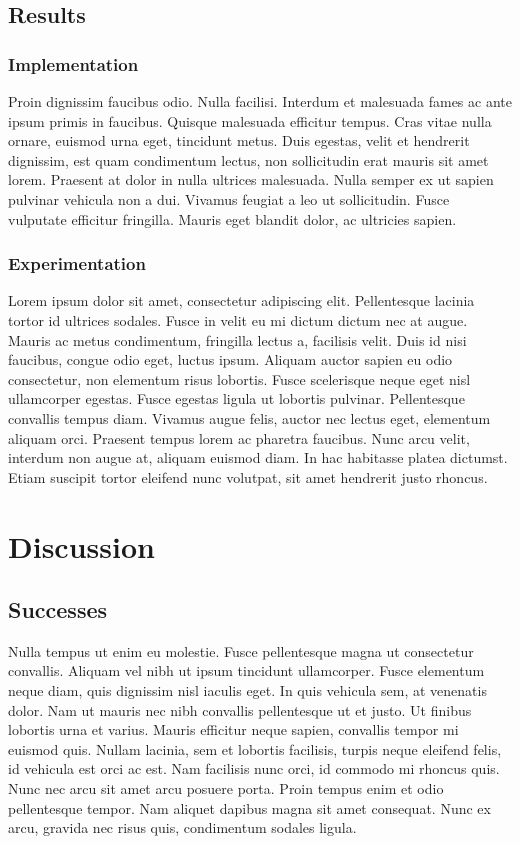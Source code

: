 \section{Results}

\subsection{Implementation}
Proin dignissim faucibus odio. Nulla facilisi. Interdum et malesuada fames ac ante ipsum primis in faucibus. Quisque malesuada efficitur tempus. Cras vitae nulla ornare, euismod urna eget, tincidunt metus. Duis egestas, velit et hendrerit dignissim, est quam condimentum lectus, non sollicitudin erat mauris sit amet lorem. Praesent at dolor in nulla ultrices malesuada. Nulla semper ex ut sapien pulvinar vehicula non a dui. Vivamus feugiat a leo ut sollicitudin. Fusce vulputate efficitur fringilla. Mauris eget blandit dolor, ac ultricies sapien.

\subsection{Experimentation}
Lorem ipsum dolor sit amet, consectetur adipiscing elit. Pellentesque lacinia tortor id ultrices sodales. Fusce in velit eu mi dictum dictum nec at augue. Mauris ac metus condimentum, fringilla lectus a, facilisis velit. Duis id nisi faucibus, congue odio eget, luctus ipsum. Aliquam auctor sapien eu odio consectetur, non elementum risus lobortis. Fusce scelerisque neque eget nisl ullamcorper egestas. Fusce egestas ligula ut lobortis pulvinar. Pellentesque convallis tempus diam. Vivamus augue felis, auctor nec lectus eget, elementum aliquam orci. Praesent tempus lorem ac pharetra faucibus. Nunc arcu velit, interdum non augue at, aliquam euismod diam. In hac habitasse platea dictumst. Etiam suscipit tortor eleifend nunc volutpat, sit amet hendrerit justo rhoncus.


\chapter{Discussion}

\section{Successes}
Nulla tempus ut enim eu molestie. Fusce pellentesque magna ut consectetur convallis. Aliquam vel nibh ut ipsum tincidunt ullamcorper. Fusce elementum neque diam, quis dignissim nisl iaculis eget. In quis vehicula sem, at venenatis dolor. Nam ut mauris nec nibh convallis pellentesque ut et justo. Ut finibus lobortis urna et varius. Mauris efficitur neque sapien, convallis tempor mi euismod quis. Nullam lacinia, sem et lobortis facilisis, turpis neque eleifend felis, id vehicula est orci ac est. Nam facilisis nunc orci, id commodo mi rhoncus quis. Nunc nec arcu sit amet arcu posuere porta. Proin tempus enim et odio pellentesque tempor. Nam aliquet dapibus magna sit amet consequat. Nunc ex arcu, gravida nec risus quis, condimentum sodales ligula.

